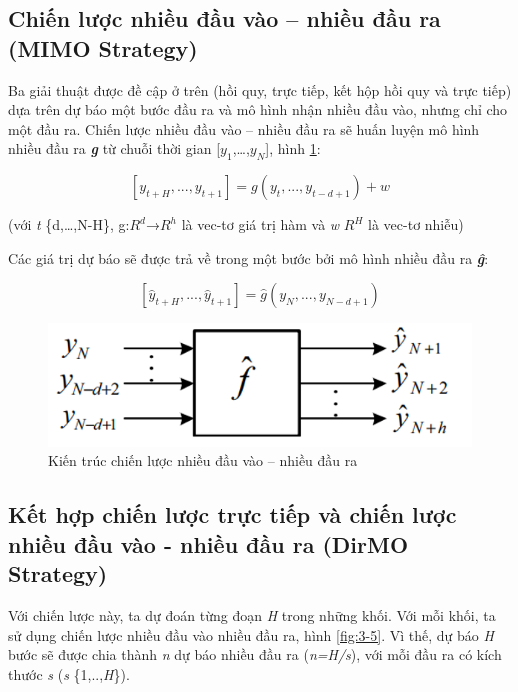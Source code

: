 \subsection{Chiến lược nhiều đầu vào – nhiều đầu ra (MIMO Strategy)}
Ba giải thuật được đề cập ở trên (hồi quy, trực tiếp, kết hộp hồi quy và trực tiếp) dựa trên dự báo một bước đầu ra và mô hình nhận nhiều đầu vào, nhưng chỉ cho một đầu ra.
Chiến lược nhiều đầu vào – nhiều đầu ra sẽ huấn luyện mô hình nhiều đầu ra \textbf{\textit{g}} từ chuỗi thời gian [$y_{1}$,…,$y_{N}$], hình \ref{fig:3-4}:

\begin{equation}
\label{eq:18}
[y_{t+H},...,y_{t+1}] = g(y_t,...,y_{t-d+1}) + w
\tag{18}
\end{equation}

\begin{center}
(với \textit{t} \in \{d,…,N-H\}, g:$R^{d}$→$R^{h}$ là vec-tơ giá trị hàm và \textit{w} \in \: $R^{H}$ là vec-tơ nhiễu)
\end{center}

Các giá trị dự báo sẽ được trả về trong một bước bởi mô hình nhiều đầu ra \textit{\textbf{ĝ}}:

\begin{equation}
\label{eq:19}
[\widehat{y}_{t+H},...,\widehat{y}_{t+1}] = \widehat{g}(y_N,...,y_{N-d+1})
\tag{19}
\end{equation}

\begin{figure}[H]
    \centering
    \includegraphics[scale=0.75]{./content/images/3-4.png}
    \caption{Kiến trúc chiến lược nhiều đầu vào – nhiều đầu ra \cite{st17}}
    \label{fig:3-4}
\end{figure}

\subsection{Kết hợp chiến lược trực tiếp và chiến lược nhiều đầu vào - nhiều đầu ra (DirMO Strategy)}
Với chiến lược này, ta dự đoán từng đoạn \textit{H} trong những khối. Với mỗi khối, ta sử dụng chiến lược nhiều đầu vào nhiều đầu ra, hình \ref{fig:3-5}. Vì thế, dự báo \textit{H} bước sẽ được chia thành \textit{n} dự báo nhiều đầu ra (\textit{n=H/s}), với mỗi đầu ra có kích thước \textit{s} (\textit{s} \in \{1,..,\textit{H}\}).

